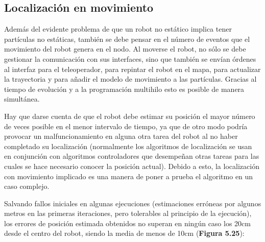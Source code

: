 \subsection{Localización en movimiento}
Además del evidente problema de que un robot no estático implica tener partículas no estáticas, también se debe pensar en el número de eventos que el movimiento del robot genera en el nodo. Al moverse el robot, no sólo se debe gestionar la comunicación con sus interfaces, sino que también se envían órdenes al interfaz para el teleoperador, para repintar el robot en el mapa, para actualizar la trayectoria y para añadir el modelo de movimiento a las partículas. Gracias al tiempo de evolución y a la programación multihilo esto es posible de manera simultánea.

Hay que darse cuenta de que el robot debe estimar su posición el mayor número de veces posible en el menor intervalo de tiempo, ya que de otro modo podría provocar un malfuncionamiento en alguna otra tarea del robot al no haber completado su localización (normalmente los algoritmos de localización se usan en conjunción con algoritmos controladores que desempeñan otras tareas para las cuales se hace necesario conocer la posición actual). Debido a esto, la localización con movimiento implicado es una manera de poner a prueba el algoritmo en un caso complejo.

Salvando fallos iniciales en algunas ejecuciones (estimaciones erróneas por algunos metros en las primeras iteraciones, pero tolerables al principio de la ejecución), los errores de posición estimada obtenidos no superan en ningún caso los 20cm desde el centro del robot, siendo la media de menos de 10cm (\textbf{Figura 5.25}):

